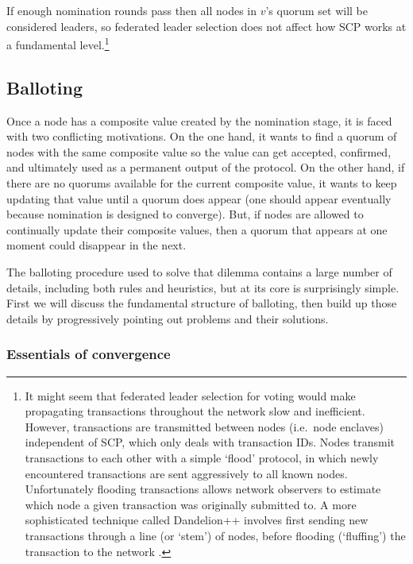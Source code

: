 If enough nomination rounds pass then all nodes in $v$'s quorum set will be considered leaders, so federated leader selection does not affect how SCP works at a fundamental level.\footnote{It might seem that federated leader selection for voting would make propagating transactions throughout the network slow and inefficient. However, transactions are transmitted between nodes  (i.e.\ node enclaves) independent of SCP, which only deals with transaction IDs. Nodes transmit transactions to each other with a simple `flood' protocol, in which newly encountered transactions are sent aggressively to all known nodes. Unfortunately flooding transactions allows network observers to estimate which node a given transaction was originally submitted to. A more sophisticated technique called Dandelion++ involves first sending new transactions through a line (or `stem') of nodes, before flooding (`fluffing') the transaction to the network \cite{dandelion-plus-plus}.}%


\subsection{Balloting}
\label{subsec:consensus-balloting}

Once a node has a composite value created by the nomination stage, it is faced with two conflicting motivations. On the one hand, it wants to find a quorum of nodes with the same composite value so the value can get accepted, confirmed, and ultimately used as a permanent output of the protocol. On the other hand, if there are no quorums available for the current composite value, it wants to keep updating that value until a quorum does appear (one should appear eventually because nomination is designed to converge). But, if nodes are allowed to continually update their composite values, then a quorum that appears at one moment could disappear in the next.

The balloting procedure used to solve that dilemma contains a large number of details, including both rules and heuristics, but at its core is surprisingly simple. First we will discuss the fundamental structure of balloting, then build up those details by progressively pointing out problems and their solutions.

\subsubsection{Essentials of convergence}

